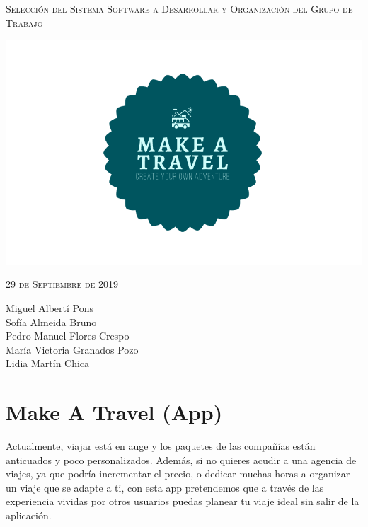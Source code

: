 \documentclass[11pt]{article}
\begin{document}
\begin{titlepage}
\centering
\vspace{4.5cm}
{\scshape\LARGE Selección del Sistema Software a Desarrollar y Organización del Grupo de Trabajo \par}
\vspace{1.5cm}

\includegraphics[width=16cm] {../Imagenes/Logo}

\vspace{3cm}
{\scshape\large 29 de Septiembre de 2019\par}
\vspace{1cm}

{Miguel Albertí Pons\\
Sofía Almeida Bruno\\
Pedro Manuel Flores Crespo\\
María Victoria Granados Pozo\\
Lidia Martín Chica
\par}

\end{titlepage}





\newpage
\section {Make A Travel (App)}
Actualmente, viajar está en auge y los paquetes de las compañías están anticuados y poco personalizados. Además, si no quieres acudir a una agencia de viajes, ya que podría incrementar el precio, o dedicar muchas horas a organizar un viaje que se adapte a ti, con esta app pretendemos que a través de las experiencia vividas por otros usuarios puedas planear tu viaje ideal sin salir de la aplicación.
\end{document}
